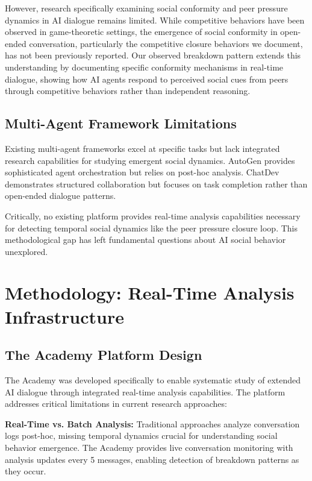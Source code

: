 \documentclass[11pt,letterpaper]{article}
\newcommand{\theacademy}{The Academy}
\begin{document}
However, research specifically examining social conformity and peer pressure dynamics in AI dialogue remains limited. While competitive behaviors have been observed in game-theoretic settings, the emergence of social conformity in open-ended conversation, particularly the competitive closure behaviors we document, has not been previously reported. Our observed breakdown pattern extends this understanding by documenting specific conformity mechanisms in real-time dialogue, showing how AI agents respond to perceived social cues from peers through competitive behaviors rather than independent reasoning.

\subsection{Multi-Agent Framework Limitations}

Existing multi-agent frameworks excel at specific tasks but lack integrated research capabilities for studying emergent social dynamics. AutoGen \citep{wu2023autogen} provides sophisticated agent orchestration but relies on post-hoc analysis. ChatDev \citep{qian2023chatdev} demonstrates structured collaboration but focuses on task completion rather than open-ended dialogue patterns.

Critically, no existing platform provides real-time analysis capabilities necessary for detecting temporal social dynamics like the peer pressure closure loop. This methodological gap has left fundamental questions about AI social behavior unexplored.

\section{Methodology: Real-Time Analysis Infrastructure}

\subsection{The Academy Platform Design}

\theacademy{} was developed specifically to enable systematic study of extended AI dialogue through integrated real-time analysis capabilities. The platform addresses critical limitations in current research approaches:

\textbf{Real-Time vs. Batch Analysis:} Traditional approaches analyze conversation logs post-hoc, missing temporal dynamics crucial for understanding social behavior emergence. \theacademy{} provides live conversation monitoring with analysis updates every 5 messages, enabling detection of breakdown patterns as they occur.
\end{document}
